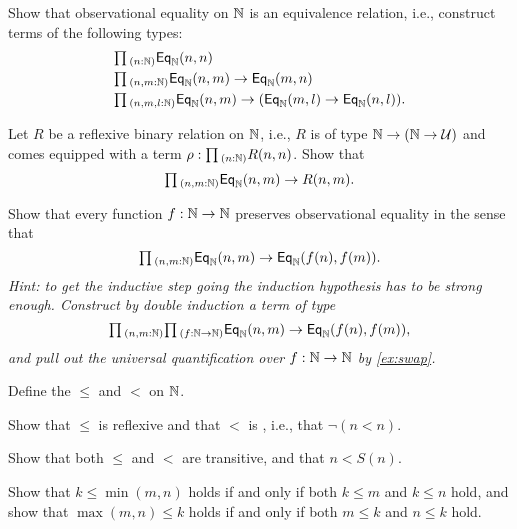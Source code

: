 \begin{exercises}
\item \label{ex:obs_nat_eqrel}Show that observational equality on ${\mathbb{N}}$ is an equivalence relation, i.e., construct terms of the following types:
  \begin{align*}
    & \prd{n:\N} \EqN(n,n) \\
    & \prd{n,m:\N} \EqN(n,m)\to \EqN(m,n) \\
    & \prd{n,m,l:\N} \EqN(n,m)\to (\EqN(m,l)\to \EqN(n,l)).
  \end{align*}
\item \label{ex:obs_nat_least}Let $R$ be a reflexive binary relation on ${\mathbb{N}}$, i.e., $R$ is of type ${\mathbb{N}}\to ({\mathbb{N}}\to\mathcal{U})$ and comes equipped with a term $\rho:\prd{n:\N}R(n,n)$. Show that
  \begin{equation*}
    \prd{n,m:\N} \EqN(n,m)\to R(n,m).
  \end{equation*}
\item {}Show that every function $f:{\mathbb{N}}\to {\mathbb{N}}$ preserves observational equality in the sense that
  \begin{equation*}
    \prd{n,m:\N} \EqN(n,m)\to \EqN(f(n),f(m)).
  \end{equation*}
  \emph{Hint: to get the inductive step going the induction hypothesis has to be strong enough. Construct by double induction a term of type}
  \begin{equation*}
    \prd{n,m:\N}{f:\N\to\N} \EqN(n,m)\to \EqN(f(n),f(m)),
  \end{equation*}
  \emph{and pull out the universal quantification over $f:{\mathbb{N}}\to{\mathbb{N}}$ by \cref{ex:swap}.}
\item 
  \begin{subexenum}
  \item Define the  $\leq$ and $<$ on ${\mathbb{N}}$.
  \item Show that $\leq$ is reflexive and that $<$ is , i.e., that $\neg(n<n)$. 
  \item Show that both $\leq$ and $<$ are transitive, and that $n<S(n)$.
  \item Show that $k\leq \min(m,n)$ holds if and only if both $k\leq m$ and $k\leq n$ hold, and show that $\max(m,n)\leq k$ holds if and only if both $m\leq k$ and $n\leq k$ hold.

\end{subexenum}
\end{exercises}
